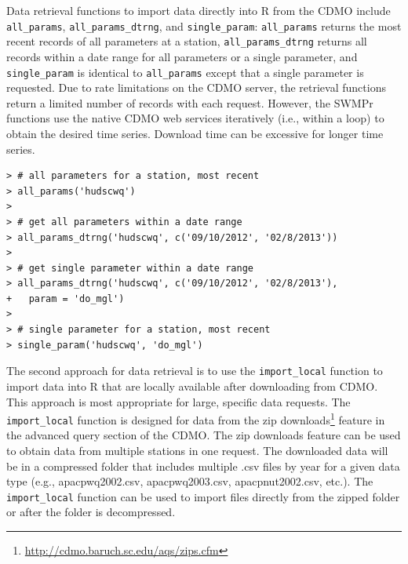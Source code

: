 \documentclass[10pt,letterpaper]{article}\usepackage[]{graphicx}\usepackage[]{color}
\makeatletter
\newenvironment{kframe}{%
 \def\at@end@of@kframe{}%
 \ifinner\ifhmode%
  \def\at@end@of@kframe{\end{minipage}}%
  \begin{minipage}{\columnwidth}%
 \fi\fi%
 \def\FrameCommand##1{\hskip\@totalleftmargin \hskip-\fboxsep
 \colorbox{shadecolor}{##1}\hskip-\fboxsep
     \hskip-\linewidth \hskip-\@totalleftmargin \hskip\columnwidth}%
 \MakeFramed {\advance\hsize-\width
   \@totalleftmargin\z@ \linewidth\hsize
   \@setminipage}}%
 {\par\unskip\endMakeFramed%
 \at@end@of@kframe}
\newenvironment{knitrout}{}{} %
\makeatother
\begin{document}
Data retrieval functions to import data directly into R from the \ac{CDMO} include \texttt{all\_params}, \texttt{all\_params\_dtrng}, and \texttt{single\_param}: \texttt{all\_params} returns the most recent records of all parameters at a station, \texttt{all\_params\_dtrng} returns all records within a date range for all parameters or a single parameter, and \texttt{single\_param} is identical to \texttt{all\_params} except that a single parameter is requested. Due to rate limitations on the \ac{CDMO} server, the retrieval functions return a limited number of records with each request.  However, the SWMPr functions use the native CDMO web services iteratively (i.e., within a loop) to obtain the desired time series.  Download time can be excessive for longer time series.     

\begin{knitrout}\small
{}\color{fgcolor}\begin{kframe}
\begin{verbatim}
> # all parameters for a station, most recent
> all_params('hudscwq')
> 
> # get all parameters within a date range
> all_params_dtrng('hudscwq', c('09/10/2012', '02/8/2013'))
> 
> # get single parameter within a date range
> all_params_dtrng('hudscwq', c('09/10/2012', '02/8/2013'), 
+   param = 'do_mgl')
> 
> # single parameter for a station, most recent
> single_param('hudscwq', 'do_mgl')
\end{verbatim}
\end{kframe}
\end{knitrout}

The second approach for data retrieval is to use the \texttt{import\_local} function to import data into R that are locally available after downloading from \ac{CDMO}.  This approach is most appropriate for large, specific data requests. The \texttt{import\_local} function is designed for data from the zip downloads\footnote{\url{http://cdmo.baruch.sc.edu/aqs/zips.cfm}} feature in the advanced query section of the \ac{CDMO}. The zip downloads feature can be used to obtain data from multiple stations in one request.  The downloaded data will be in a compressed folder that includes multiple .csv files by year for a given data type (e.g., apacpwq2002.csv, apacpwq2003.csv, apacpnut2002.csv, etc.).  The \texttt{import\_local} function can be used to import files directly from the zipped folder or after the folder is decompressed.
\end{document}

